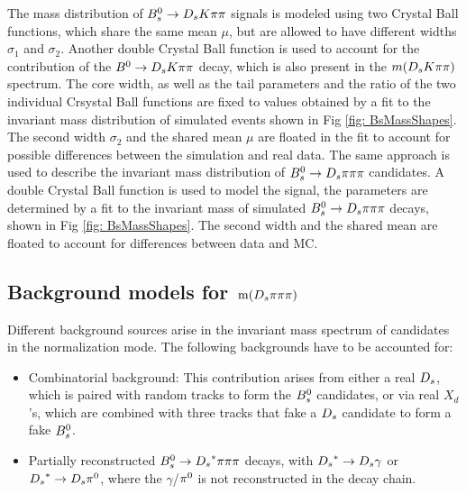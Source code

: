 The mass distribution of ${{B}^0_{s}}\rightarrow{\ensuremath{{D}_{s}}}{\ensuremath{K}}{\ensuremath{\pi}}{\ensuremath{\pi}}$ signals is modeled using two Crystal Ball functions, which share the same mean $\mu$, but are allowed to have different widths $\sigma_{1}$ and $\sigma_{2}$. 
Another double Crystal Ball function is used to account for the contribution of the ${B}^{0}\rightarrow{\ensuremath{{D}_{s}}}{\ensuremath{K}}{\ensuremath{\pi}}{\ensuremath{\pi}}$ decay, which is also present in the $m({{D}_{s}}{K}{\pi}{\pi})$ spectrum.
The core width, as well as the tail parameters and the ratio of the two individual Crsystal Ball functions are fixed to values obtained by a fit to the invariant mass distribution of simulated events shown in Fig \ref{fig: BsMassShapes}. The second width $\sigma_{2}$ and the shared mean $\mu$ are floated in the fit to account for possible differences between the simulation and real data. \newline
The same approach is used to describe the invariant mass distribution of ${{B}^0_{s}}\rightarrow{\ensuremath{{D}_{s}}}{\ensuremath{\pi}}{\ensuremath{\pi}}{\ensuremath{\pi}}$ candidates. 
A double Crystal Ball function is used to model the signal, the parameters are determined by a fit to the invariant mass of simulated ${{B}^0_{s}}\rightarrow{\ensuremath{{D}_{s}}}{\ensuremath{\pi}}{\ensuremath{\pi}}{\ensuremath{\pi}}$ decays, shown in Fig \ref{fig: BsMassShapes}.
The second width and the shared mean are floated to account for differences between data and MC.

\subsection{Background models for $\mathrm{ \,m}({{D}_{s}}{\pi}{\pi}{\pi})$} 
\label{subsec: BkginNorm}
Different background sources arise in the invariant mass spectrum of candidates in the normalization mode. \newline
The following backgrounds have to be accounted for:
\begin{itemize}

\item Combinatorial background: This contribution arises from either a real ${{D}_{s}}$, which is paired with random tracks to form the ${{B}^0_{s}}$ candidates, or via real $X_{d}$'s, which are combined with three tracks that fake a ${{D}_{s}}$ candidate to form a fake ${{B}^0_{s}}$.   

\item Partially reconstructed ${{B}^0_{s}}\rightarrow{\ensuremath{{D}_{s}}}^{*}{\pi}{\pi}{\pi}$ decays, with ${{D}_{s}}^{*}\rightarrow{\ensuremath{{D}_{s}}}\gamma$ or ${{D}_{s}}^{*}\rightarrow{\ensuremath{{D}_{s}}}{\ensuremath{{\pi}^0}}$, where the $\gamma$/${{\pi}^0}$ is not reconstructed in the decay chain. 

\end{itemize}

